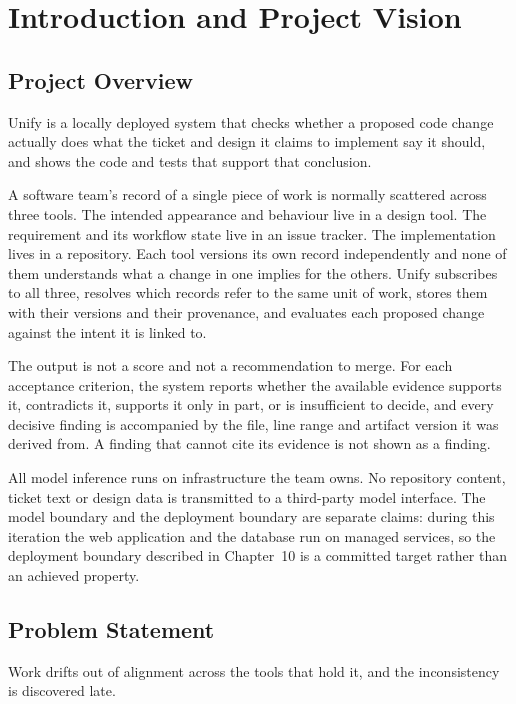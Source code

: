\chapter{Introduction and Project Vision}

\section{Project Overview}

Unify is a locally deployed system that checks whether a proposed code change
actually does what the ticket and design it claims to implement say it should,
and shows the code and tests that support that conclusion.

A software team's record of a single piece of work is normally scattered across
three tools. The intended appearance and behaviour live in a design tool. The
requirement and its workflow state live in an issue tracker. The implementation
lives in a repository. Each tool versions its own record independently and none
of them understands what a change in one implies for the others. Unify
subscribes to all three, resolves which records refer to the same unit of work,
stores them with their versions and their provenance, and evaluates each
proposed change against the intent it is linked to.

The output is not a score and not a recommendation to merge. For each acceptance
criterion, the system reports whether the available evidence supports it,
contradicts it, supports it only in part, or is insufficient to decide, and every
decisive finding is accompanied by the file, line range and artifact version it
was derived from. A finding that cannot cite its evidence is not shown as a
finding.

All model inference runs on infrastructure the team owns. No repository content,
ticket text or design data is transmitted to a third-party model interface. The
model boundary and the deployment boundary are separate claims: during this
iteration the web application and the database run on managed services, so the
deployment boundary described in Chapter~10 is a committed target rather than an
achieved property.

\section{Problem Statement}

Work drifts out of alignment across the tools that hold it, and the
inconsistency is discovered late.

